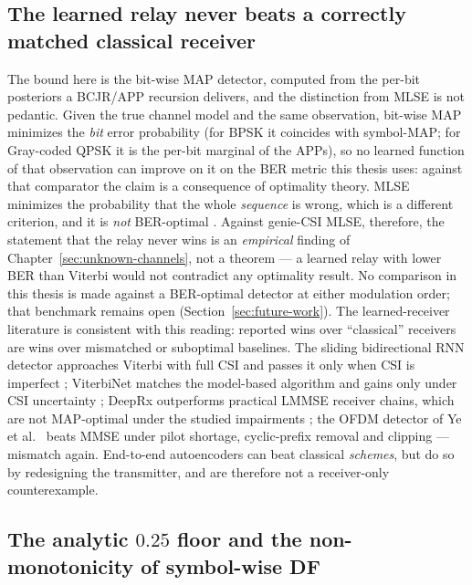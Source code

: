 \subsection{The learned relay never beats a correctly matched classical receiver}

The bound here is the bit-wise MAP detector, computed from the per-bit posteriors a BCJR/APP recursion delivers, and the distinction from MLSE is not pedantic. Given the true channel model and the same observation, bit-wise MAP minimizes the \emph{bit} error probability (for BPSK it coincides with symbol-MAP; for Gray-coded QPSK it is the per-bit marginal of the APPs), so no learned function of that observation can improve on it on the BER metric this thesis uses: against that comparator the claim is a consequence of optimality theory. MLSE minimizes the probability that the whole \emph{sequence} is wrong, which is a different criterion, and it is \emph{not} BER-optimal \cite{Forney1972MLSE, BahlCockeJelinekRaviv1974BCJR, ProakisSalehi2008DigitalComm}. Against genie-CSI MLSE, therefore, the statement that the relay never wins is an \emph{empirical} finding of Chapter~\ref{sec:unknown-channels}, not a theorem --- a learned relay with lower BER than Viterbi would not contradict any optimality result. No comparison in this thesis is made against a BER-optimal detector at either modulation order; that benchmark remains open (Section~\ref{sec:future-work}). The learned-receiver literature is consistent with this reading: reported wins over ``classical'' receivers are wins over mismatched or suboptimal baselines. The sliding bidirectional RNN detector approaches Viterbi with full CSI and passes it only when CSI is imperfect \cite{FarsadGoldsmith2018NNDetection}; ViterbiNet matches the model-based algorithm and gains only under CSI uncertainty \cite{Shlezinger2020ViterbiNet}; DeepRx outperforms practical LMMSE receiver chains, which are not MAP-optimal under the studied impairments \cite{Honkala2021DeepRx}; the OFDM detector of Ye et al.~\cite{YeLiJuang2018OFDMDL} beats MMSE under pilot shortage, cyclic-prefix removal and clipping --- mismatch again. End-to-end autoencoders \cite{OSheaHoydis2017PhysicalLayer} can beat classical \emph{schemes}, but do so by redesigning the transmitter, and are therefore not a receiver-only counterexample.

\subsection{The analytic $0.25$ floor and the non-monotonicity of symbol-wise DF}


